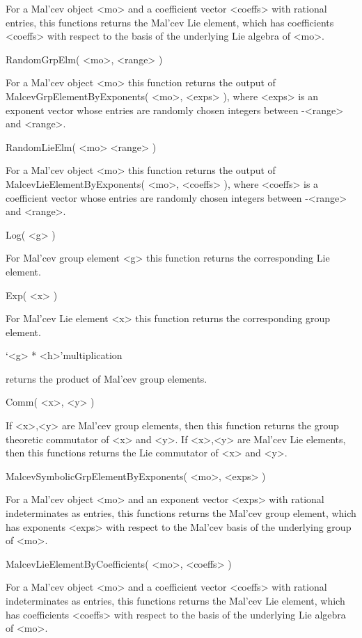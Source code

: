 For a Mal'cev object <mo> and a coefficient vector <coeffs> with rational 
entries, this functions returns the Mal'cev Lie element, which 
has coefficients  <coeffs> with respect to the basis of the underlying
Lie algebra of <mo>.

\> RandomGrpElm( <mo>, <range> )

For a Mal'cev object <mo> this function returns the output of 
MalcevGrpElementByExponents( <mo>, <exps> ), where <exps> is an
exponent vector whose entries are randomly chosen integers between 
-<range> and <range>.

\> RandomLieElm( <mo> <range> )

For a Mal'cev object <mo> this function returns the output of 
MalcevLieElementByExponents( <mo>, <coeffs> ), where <coeffs> is 
a coefficient vector whose entries are randomly chosen integers between 
-<range> and <range>.

\> Log( <g> )

For Mal'cev group element <g> this function returns the corresponding
Lie element.

\> Exp( <x> )

For Mal'cev Lie element <x> this function returns the corresponding
group element.

\> `<g> * <h>'{multiplication} 

returns the product of Mal'cev group elements.

\> Comm( <x>, <y> )

If <x>,<y> are Mal'cev group elements, then this function returns
the group theoretic commutator of <x> and <y>.
If <x>,<y> are Mal'cev Lie elements, then this functions returns
the Lie commutator of <x> and <y>.

\> MalcevSymbolicGrpElementByExponents( <mo>, <exps> )

For a Mal'cev object <mo> and an exponent vector <exps> with rational 
indeterminates as entries, 
this functions returns the Mal'cev group element, which 
has exponents <exps> with respect to the Mal'cev basis of the underlying
group of <mo>.

\> MalcevLieElementByCoefficients( <mo>, <coeffs> )

For a Mal'cev object <mo> and a coefficient vector <coeffs> with rational 
indeterminates as entries, 
this functions returns the Mal'cev Lie element, which 
has coefficients  <coeffs> with respect to the basis of the underlying
Lie algebra of <mo>.


